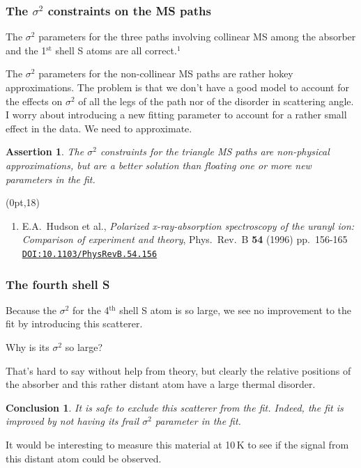 \documentclass[10pt, xcolor=x11names, compress, handout]{beamer}
\newtheorem{conclusion}[theorem]{Conclusion}
\newtheorem{assertion}[theorem]{Assertion}
\begin{document}
\begin{frame}
  \frametitle{The $\sigma^2$ constraints on the MS paths}
  The $\sigma^2$ parameters for the three paths involving collinear MS
  among the absorber and the 1$^{\mathrm{st}}$ shell S atoms are all
  correct.$^1$

  \bigskip

  The $\sigma^2$ parameters for the non-collinear MS paths are rather
  hokey approximations.  The problem is that we don't have a good
  model to account for the effects on $\sigma^2$ of all the legs of
  the path nor of the disorder in scattering angle.  I worry about
  introducing a new fitting parameter to account for a rather small
  effect in the data.  We need to approximate.

  \begin{assertion}
    The $\sigma^2$ constraints for the triangle MS paths are
    non-physical approximations, but are a better solution than
    floating one or more new parameters in the fit.
  \end{assertion}

  \begin{textblock*}{0.9\linewidth}(0pt,18\TPVertModule)%
    \begin{enumerate}[1.]
    \tiny
  \item E.A.\ Hudson et al., \textit{Polarized x-ray-absorption
      spectroscopy of the uranyl ion: Comparison of experiment and
      theory}, Phys.\ Rev.\ B \textbf{54} (1996) pp.\ 156-165
    \href{http://dx.doi.org/10.1103/PhysRevB.54.156}
    {\color{Blue4}\texttt{DOI:10.1103/PhysRevB.54.156}}
  \end{enumerate}
\end{textblock*}
\end{frame}

\begin{frame}
  \frametitle{The fourth shell S}
  Because the $\sigma^2$ for the 4$^{\mathrm{th}}$ shell S atom is so
  large, we see no improvement to the fit by introducing this
  scatterer.  

  \begin{center}
    Why is its $\sigma^2$ so large?
  \end{center}

  That's hard to say without help from theory, but clearly the
  relative positions of the absorber and this rather distant atom have
  a large thermal disorder.

  \begin{conclusion}
    It is safe to exclude this scatterer from the fit.  Indeed, the
    fit is improved by not having its frail $\sigma^2$ parameter in
    the fit.
  \end{conclusion}

  It would be interesting to measure this material at 10\,K to see if
  the signal from this distant atom could be observed.
\end{frame}
\end{document}
